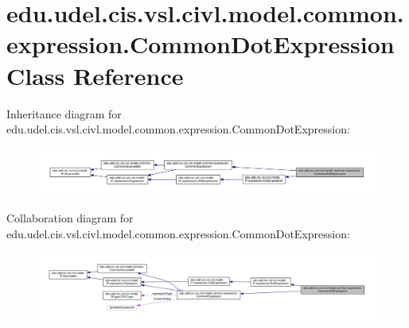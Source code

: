 \hypertarget{classedu_1_1udel_1_1cis_1_1vsl_1_1civl_1_1model_1_1common_1_1expression_1_1CommonDotExpression}{}\section{edu.\+udel.\+cis.\+vsl.\+civl.\+model.\+common.\+expression.\+Common\+Dot\+Expression Class Reference}
\label{classedu_1_1udel_1_1cis_1_1vsl_1_1civl_1_1model_1_1common_1_1expression_1_1CommonDotExpression}


Inheritance diagram for edu.\+udel.\+cis.\+vsl.\+civl.\+model.\+common.\+expression.\+Common\+Dot\+Expression\+:
\nopagebreak
\begin{figure}[H]
\begin{center}
\leavevmode
\includegraphics[width=350pt]{classedu_1_1udel_1_1cis_1_1vsl_1_1civl_1_1model_1_1common_1_1expression_1_1CommonDotExpression__inherit__graph}
\end{center}
\end{figure}


Collaboration diagram for edu.\+udel.\+cis.\+vsl.\+civl.\+model.\+common.\+expression.\+Common\+Dot\+Expression\+:
\nopagebreak
\begin{figure}[H]
\begin{center}
\leavevmode
\includegraphics[width=350pt]{classedu_1_1udel_1_1cis_1_1vsl_1_1civl_1_1model_1_1common_1_1expression_1_1CommonDotExpression__coll__graph}
\end{center}
\end{figure}
